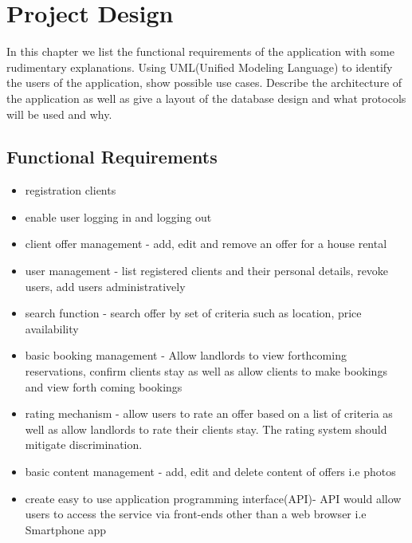 \chapter{Project Design}

In this chapter we list the functional requirements of the application with some rudimentary explanations. Using UML(Unified Modeling Language) to identify the users of the application, show possible use cases. Describe the architecture of the application as well as give a layout of the database design and what protocols will be used and why.
\section{Functional Requirements}
\begin{itemize}
\item registration clients
\item enable user logging in and logging out 
\item client offer management - add, edit and remove an offer for a house rental
\item user management - list registered clients and their personal details, revoke users, add users administratively 
\item search function - search offer by set of criteria such as location, price availability 
\item basic booking management - Allow landlords to view forthcoming reservations, confirm clients stay as well as allow clients to make bookings and view forth coming bookings
\item rating mechanism - allow users to rate an offer based on a list of criteria as well as allow landlords to rate their clients stay. The rating system should mitigate discrimination.
\item basic content management - add, edit and delete content of offers i.e photos
\item create easy to use application programming interface(API)- API would allow users to access the service via front-ends other than a web browser i.e Smartphone app
\end{itemize}
\clearpage
